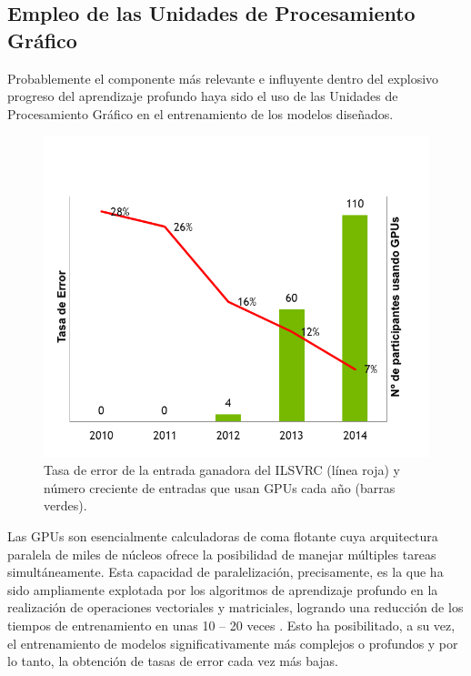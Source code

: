 \subsection{Empleo de las Unidades de Procesamiento Gráfico}

Probablemente el componente más relevante e influyente dentro del explosivo progreso del aprendizaje profundo haya sido el uso de las Unidades de Procesamiento Gráfico en el entrenamiento de los modelos diseñados.

\begin{figure}
    \centering
    \includegraphics[scale=0.75]{Images/ILSVRC.png}
    \caption{Tasa de error de la entrada ganadora del ILSVRC (línea roja) y número creciente de entradas que usan GPUs cada año (barras verdes).\cite{img:ILSVRC}}
    \label{fig:ILSVRC}
\end{figure}

Las GPUs son esencialmente calculadoras de coma flotante cuya arquitectura paralela de miles de núcleos ofrece la posibilidad de manejar múltiples tareas simultáneamente. Esta capacidad de paralelización, precisamente, es la que ha sido ampliamente explotada por los algoritmos de aprendizaje profundo en la realización de operaciones vectoriales y matriciales, logrando una reducción de los tiempos de entrenamiento en unas 10 -- 20 veces \cite{DeepLearning}. Esto ha posibilitado, a su vez, el entrenamiento de modelos significativamente más complejos o profundos y por lo tanto, la obtención de tasas de error cada vez más bajas.

